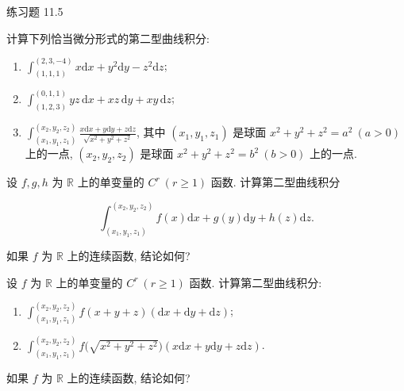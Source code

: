 \begin{exblock}{练习题 11.5}
\item 计算下列恰当微分形式的第二型曲线积分:

  \begin{enumerate}[label=(\arabic*),leftmargin=2.6em,itemsep=0.15\baselineskip,topsep=0.2\baselineskip]

  \item $\displaystyle\int_{(1,1,1)}^{(2,3,-4)}x\mathrm{d}x+y^{2}\mathrm{d}y-z^{2}\mathrm{d}z$;

  \item $\displaystyle\int_{(1,2,3)}^{(0,1,1)}yz\,\mathrm{d}x+xz\,\mathrm{d}y+xy\,\mathrm{d}z$;

  \item $\displaystyle\int_{(x_{1},y_{1},z_{1})}^{(x_{2},y_{2},z_{2})}\frac{x\mathrm{d}x+y\mathrm{d}y+z\mathrm{d}z}{\sqrt{x^{2}+y^{2}+z^{2}}}$, 其中 $(x_{1},y_{1},z_{1})$ 是球面 $x^{2}+y^{2}+z^{2}=a^{2}\ (a>0)$ 上的一点, $(x_{2},y_{2},z_{2})$ 是球面 $x^{2}+y^{2}+z^{2}=b^{2}\ (b>0)$ 上的一点.

  \end{enumerate}

\item 设 $f,g,h$ 为 $\mathbb{R}$ 上的单变量的 $C^{r}\ (r\geqslant1)$ 函数. 计算第二型曲线积分

  \[
  \int_{(x_{1},y_{1},z_{1})}^{(x_{2},y_{2},z_{2})}f(x)\mathrm{d}x+g(y)\mathrm{d}y+h(z)\mathrm{d}z.
  \]

  如果 $f$ 为 $\mathbb{R}$ 上的连续函数, 结论如何?

\item 设 $f$ 为 $\mathbb{R}$ 上的单变量的 $C^{r}\ (r\geqslant1)$ 函数. 计算第二型曲线积分:

  \begin{enumerate}[label=(\arabic*),leftmargin=2.6em,itemsep=0.15\baselineskip,topsep=0.2\baselineskip]

  \item $\displaystyle\int_{(x_{1},y_{1},z_{1})}^{(x_{2},y_{2},z_{2})}f(x+y+z)(\mathrm{d}x+\mathrm{d}y+\mathrm{d}z)$;

  \item $\displaystyle\int_{(x_{1},y_{1},z_{1})}^{(x_{2},y_{2},z_{2})}f\bigl(\sqrt{x^{2}+y^{2}+z^{2}}\bigr)(x\mathrm{d}x+y\mathrm{d}y+z\mathrm{d}z)$.

  \end{enumerate}

  如果 $f$ 为 $\mathbb{R}$ 上的连续函数, 结论如何?


\end{exblock}
